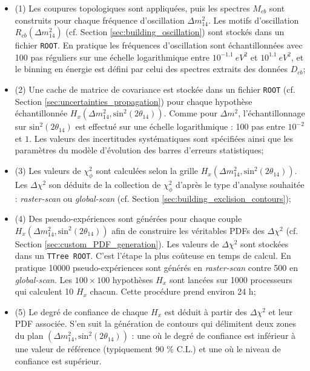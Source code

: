 \begin{itemize}[label=\textbullet]
    \item (1) Les coupures topologiques sont appliquées, puis les spectres $M_{cb}$ sont construits pour chaque fréquence d'oscillation $\Delta m_{14}^2$. Les motifs d'oscillation $R_{cb}(\Delta m_{14}^2)$ (cf. Section \ref{sec:building_oscillation}) sont stockés dans un fichier \texttt{ROOT}. En pratique les fréquences d'oscillation sont échantillonnées avec 100 pas réguliers sur une échelle logarithmique entre $10^{-1.1}\SI{}{eV^2}$ et $10^{1.1}\SI{}{eV^2}$, et le binning en énergie est défini par celui des spectres extraits des données $D_{cb}$;
    \item (2) Une cache de matrice de covariance est stockée dans un fichier \texttt{ROOT} (cf. Section \ref{sec:uncertainties_propagation}) pour chaque hypothèse échantillonnée $H_x(\Delta m^{2}_{14}, \textrm{sin}^2(2\theta_{14}))$. Comme pour $\Delta m^{2}$, l'échantillonnage sur $\textrm{sin}^2(2\theta_{14})$ est effectué sur une échelle logarithmique : 100 pas entre $10^{-2}$ et $1$. Les valeurs des incertitudes systématiques sont spécifiées ainsi que les paramètres du modèle d'évolution des barres d'erreurs statistiques;
    \item (3) Les valeurs de $\chi^2_{\phi}$ sont calculées selon la grille $H_x(\Delta m^{2}_{14}, \textrm{sin}^2(2\theta_{14}))$. Les $\Delta\chi^2$ son déduits de la collection de $\chi^2_\phi$ d'après le type d'analyse souhaitée : \textit{raster-scan} ou \textit{global-scan} (cf. Section \ref{sec:building_exclision_contours});
    \item (4) Des pseudo-expériences sont générées pour chaque couple $H_x(\Delta m^{2}_{14}, \textrm{sin}^2(2\theta_{14}))$ afin de construire les véritables PDFs des $\Delta\chi^2$ (cf. Section \ref{sec:custom_PDF_generation}). Les valeurs de $\Delta\chi^2$ sont stockées dans un \texttt{TTree ROOT}. C'est l'étape la plus coûteuse en temps de calcul. En pratique 10000 pseudo-expériences sont générés en \textit{raster-scan} contre 500 en \textit{global-scan}. Les $100 \times 100$ hypothèses $H_x$ sont lancées sur 1000 processeurs qui calculent 10 $H_x$ chacun. Cette procédure prend environ 24 h;
    \item (5) Le degré de confiance de chaque $H_x$ est déduit à partir des $\Delta\chi^2$ et leur PDF associée. S'en suit la génération de contours qui délimitent deux zones du plan $(\Delta m^{2}_{14}, \textrm{sin}^2(2\theta_{14}))$ : une où le degré de confiance est inférieur à une valeur de référence (typiquement 90 \% C.L.) et une où le niveau de confiance est supérieur.
\end{itemize}

